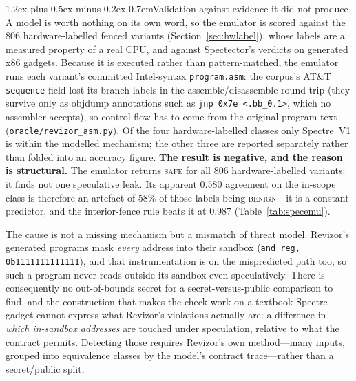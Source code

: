 \documentclass[conference]{IEEEtran}
\makeatletter
\renewcommand\paragraph{\@startsection{paragraph}{4}{\z@}%
  {1.2ex plus 0.5ex minus 0.2ex}{-0.7em}{\normalfont\normalsize\bfseries}}
\makeatother
\begin{document}
\paragraph{Validation against evidence it did not produce}
A model is worth nothing on its own word, so the emulator is scored against the
806 hardware-labelled fenced variants (Section~\ref{sec:hwlabel}), whose labels
are a measured property of a real CPU, and against Spectector's verdicts on
generated x86 gadgets. Because it is executed rather than pattern-matched, the
emulator runs each variant's committed Intel-syntax \texttt{program.asm}: the
corpus's AT\&T \texttt{sequence} field lost its branch labels in the
assemble/disassemble round trip (they survive only as objdump annotations such
as \texttt{jnp 0x7e <.bb\_0.1>}, which no assembler accepts), so control flow
has to come from the original program text
(\texttt{oracle/revizor\_asm.py}). Of the four hardware-labelled classes only
Spectre~V1 is within the modelled mechanism; the other three are reported
separately rather than folded into an accuracy figure.
\textbf{The result is negative, and the reason is structural.} The emulator
returns \textsc{safe} for all 806 hardware-labelled variants: it finds not one
speculative leak. Its apparent 0.580 agreement on the in-scope class is
therefore an artefact of 58\% of those labels being \textsc{benign}---it is a
constant predictor, and the interior-fence rule beats it at 0.987
(Table~\ref{tab:specemu}).

The cause is not a missing mechanism but a mismatch of threat model.
Revizor's generated programs mask \emph{every} address into their sandbox
(\texttt{and reg, 0b1111111111111}), and that instrumentation is on the
mispredicted path too, so such a program never reads outside its sandbox even
speculatively. There is consequently no out-of-bounds secret for a
secret-versus-public comparison to find, and the construction that makes the
check work on a textbook Spectre gadget cannot express what Revizor's
violations actually are: a difference in \emph{which in-sandbox addresses} are
touched under speculation, relative to what the contract permits. Detecting
those requires Revizor's own method---many inputs, grouped into equivalence
classes by the model's contract trace---rather than a secret/public split.
\end{document}
